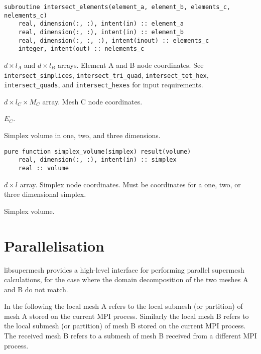 \documentclass{article}
\begin{document}
\begin{lstlisting}[language=FORTRAN]
  subroutine intersect_elements(element_a, element_b, elements_c, nelements_c)
    real, dimension(:, :), intent(in) :: element_a
    real, dimension(:, :), intent(in) :: element_b
    real, dimension(:, :, :), intent(inout) :: elements_c
    integer, intent(out) :: nelements_c
\end{lstlisting}

\begin{description}[font=\ttfamily\bfseries,leftmargin=2.2\parindent,labelindent=1.7\parindent,noitemsep]
  \item[element\_a, element\_b] $d \times l_A$ and $d \times l_B$ arrays.
    Element A and B node coordinates. See \verb+intersect_simplices+,
    \verb+intersect_tri_quad+, \verb+intersect_tet_hex+, \verb+intersect_quads+,
    and \verb+intersect_hexes+ for input requirements.
  \item[elements\_c] $d \times l_C \times M_C$ array. Mesh C node coordinates.
  \item[n\_simplices\_c] $E_C$.
\end{description}

\noindent Simplex volume in one, two, and three dimensions.

\begin{lstlisting}[language=FORTRAN]
  pure function simplex_volume(simplex) result(volume)
    real, dimension(:, :), intent(in) :: simplex
    real :: volume
\end{lstlisting}

\begin{description}[font=\ttfamily\bfseries,leftmargin=2.2\parindent,labelindent=1.7\parindent,noitemsep]
  \item[simplex] $d \times l$ array. Simplex node coordinates. Must be
    coordinates for a one, two, or three dimensional simplex.
  \item[volume] Simplex volume.
\end{description}

\section{Parallelisation}

libsupermesh provides a high-level interface for performing parallel supermesh
calculations, for the case where the domain decomposition of the two meshes A
and B do not match. 

In the following the local mesh A refers to the local submesh (or partition) of
mesh A stored on the current MPI process. Similarly the local mesh B refers to
the local submesh (or partition) of mesh B stored on the current MPI process.
The received mesh B refers to a submesh of mesh B received from a different MPI
process.
\end{document}
